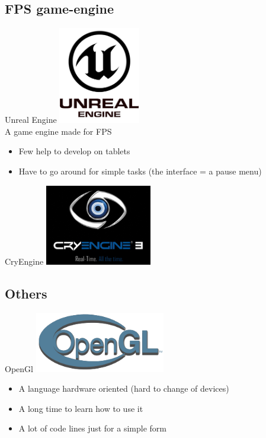 \documentclass[a4paper,10pt]{beamer}
\begin{document}
		\subsection{FPS game-engine}
		
			\begin{frame}{Unreal Engine}
				\includegraphics[height=120pt]{images/Unreal_Engine.png}\\
				A game engine made for FPS
				\begin{itemize}
					\item Few help to develop on tablets
					\item Have to go around for simple tasks (the interface = a pause menu)
				\end{itemize}
			\end{frame}
			
			\begin{frame}{CryEngine}
				\includegraphics[height=100pt]{images/Cry_Engine.png}
			\end{frame}
			
		\subsection{Others}
			
			\begin{frame}{OpenGl}
				\includegraphics[height=75pt]{images/OpenGL_logo.png}
				\begin{itemize}
					\item A language hardware oriented (hard to change of devices)
					\item A long time to learn how to use it
					\item A lot of code lines just for a simple form
				\end{itemize}
			\end{frame}
			
\end{document}
